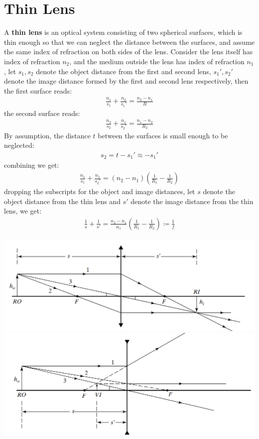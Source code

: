 \documentclass[11pt]{book}
\theoremstyle{break}
\theoremstyle{break}
\begin{document}
\section[Thin Lens]{\color{red}Thin Lens\color{black}}
A \textbf{thin lens} is an optical system consisting of two spherical surfaces, which is thin enough so that we can neglect the distance between the surfaces, and assume the same index of refraction on both sides of the lens. Consider the lens itself has index of refraction $n_2$, and the medium outside the lens has index of refraction $n_1$, let $s_1, s_2$ denote the object distance from the first and second lens, $s_1', s_2'$ denote the image distance formed by the first and second lens respectively, then the first surface reads:
\begin{align*}
\frac{n_1}{s_1} + \frac{n_2}{s_1'} = \frac{n_2-n_1}{R}
\end{align*}
the second surface reads:
\begin{align*}
\frac{n_2}{s_2} + \frac{n_1}{s_2'} = \frac{n_1-n_2}{R_2} 
\end{align*}
By assumption, the distance $t$ between the surfaces is small enough to be neglected:
\begin{align*}
s_2 = t-s_1' \approx -s_1'
\end{align*}
combining we get:
\begin{align*}
\frac{n_1}{s_1} + \frac{n_1}{s_2'} = (n_2-n_1)\left( \frac{1}{R_1} - \frac{1}{R_2}\right)
\end{align*}
dropping the subscripts for the object and image distances, let $s$ denote the object distance from the thin lens and $s'$ denote the image distance from the thin lens, we get:
\begin{align*}
\frac{1}{s}+ \frac{1}{s'} = \frac{n_2-n_1}{n_1}\left( \frac{1}{R_1} - \frac{1}{R_2}\right)\coloneqq \frac{1}{f}
\end{align*}

\hfill\break
\begin{center}
\includegraphics[scale=0.43]{concave.png}\\
\hfill\break
\hfill\break
\includegraphics[scale=0.43]{convex.png}
\end{center}
\end{document}
